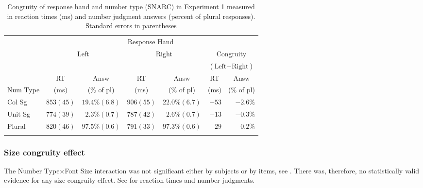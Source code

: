 \documentclass[output=paper]{langscibook}
\begin{document}
\begin{table}[h!]
\caption{Congruity of response hand and number type (SNARC) in Experiment 1 measured in reaction times (ms) and number judgment answers (percent of plural responses). Standard errors in parentheses}
\label{gul-bla:tab:SNARC-exp1}
\begin{tabular}{l rr rr rr}
\lsptoprule
&\multicolumn{6}{c}{Response Hand}\\\cmidrule(lr){2-7}
&\multicolumn{2}{c}{\multirow{2}{*}{Left}}&\multicolumn{2}{c}{\multirow{2}{*}{Right}}&\multicolumn{2}{c}{Congruity}\\
&&&&&\multicolumn{2}{c}{($\text{Left}-\text{Right}$)}\\\cmidrule(lr){2-3}\cmidrule(lr){4-5}\cmidrule(lr){6-7}
&\multicolumn{1}{c}{RT}&\multicolumn{1}{c}{Answ}&\multicolumn{1}{c}{RT}&\multicolumn{1}{c}{Answ}&\multicolumn{1}{c}{RT}&\multicolumn{1}{c}{Answ}\\
Num Type&\multicolumn{1}{c}{(ms)}&\multicolumn{1}{c}{(\% of pl)}&\multicolumn{1}{c}{(ms)}&\multicolumn{1}{c}{(\% of pl)}&\multicolumn{1}{c}{(ms)}&\multicolumn{1}{c}{(\% of pl)}\\\midrule
Col Sg  & $853 (45)$ & $19.4\% (6.8)$ & $906 (55)$ & $22.0\% (6.7)$ & $-53$ & $-2.6\%$ \\
Unit Sg & $774 (39)$ & $2.3\% (0.7)$ & $787 (42)$ & $2.6\% (0.7)$ & $-13$ & $-0.3\%$ \\
Plural  & $820 (46)$ & $97.5\% (0.6)$ & $791 (33)$ & $97.3\% (0.6)$ & $29$  & $0.2\%$  \\
\lspbottomrule
\end{tabular}
\end{table}


\subsubsection{Size congruity effect}
The Number Type×Font Size interaction was not significant either by subjects or by items, see . There was, therefore, no statistically valid evidence for any size congruity effect. See  for reaction times and number judgments.

\end{document}
